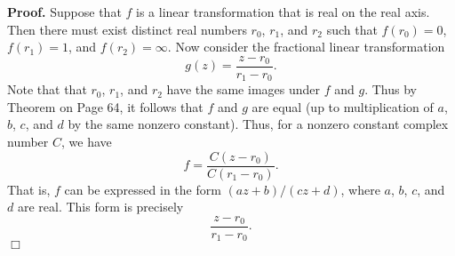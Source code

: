 \documentclass[9pt]{article}
\newcommand{\qed}{\hfill \ensuremath{\Box}}
\begin{document}
\begin{enumerate}
      \textbf{Proof.} Suppose that $f$ is a linear transformation that is real
      on the real axis. Then there must exist distinct real numbers $r_0$,
      $r_1$, and $r_2$ such that $f(r_0) = 0$, $f(r_1) = 1$, and
      $f(r_2) = \infty$. Now consider the fractional linear transformation
      $$g(z) = \frac{z-r_0}{r_1-r_0}.$$
      Note that that $r_0$, $r_1$, and $r_2$ have the same images under $f$
      and $g$. Thus by Theorem on Page 64, it follows that $f$ and $g$ are
      equal (up to multiplication of $a$, $b$, $c$, and $d$ by the same nonzero
      constant). Thus, for a nonzero constant complex number $C$, we have
      $$f = \frac{C(z - r_0)}{C(r_1 - r_0)}.$$
      That is, $f$ can be expressed in the form $(az+b)/(cz+d)$, where $a$,
      $b$, $c$, and $d$ are real. This form is precisely
      $$\frac{z-r_0}{r_1-r_0}.$$ \qed
\end{enumerate}
\end{document}
